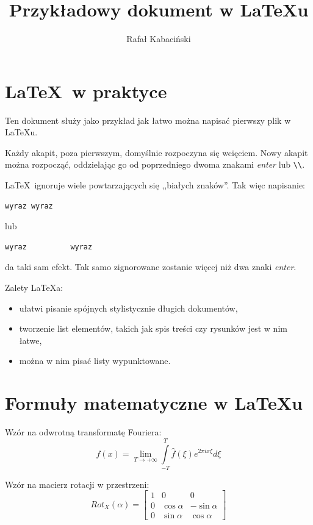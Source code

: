 \documentclass[10pt,a4paper]{article}
\title{Przykładowy dokument w \LaTeX u}
\author{Rafał Kabaciński}
\begin{document}
	
	\maketitle
	
	\tableofcontents
	
	\section{\LaTeX\ w praktyce}
	Ten dokument służy jako przykład jak łatwo można napisać pierwszy plik w \LaTeX u. 
	
	Każdy akapit, poza pierwszym, domyślnie rozpoczyna się wcięciem.
	Nowy akapit można rozpocząć, oddzielając go od poprzedniego dwoma znakami \emph{enter} lub \verb|\\|.
	
	
	
	\LaTeX\ ignoruje        wiele powtarzających się ,,białych znaków''. Tak więc napisanie: 
		\begin{lstlisting}[language=TeX]
			wyraz wyraz
		\end{lstlisting}
	
	lub
	
		\begin{lstlisting}[language=TeX]
			wyraz          wyraz
		\end{lstlisting}
	da taki sam efekt. Tak samo zignorowane zostanie więcej niż dwa znaki \emph{enter}.
	
	Zalety \LaTeX a:
	\begin{itemize}
		\item ułatwi pisanie spójnych stylistycznie długich dokumentów,
		\item tworzenie list elementów, takich jak spis treści czy rysunków jest w nim łatwe,
		\item można w nim pisać listy wypunktowane.
	\end{itemize}
	
	\section{Formuły matematyczne w \LaTeX u}
	
	Wzór na odwrotną transformatę Fouriera:
	\begin{equation}
		f(x) = \lim \limits_{T\rightarrow + \infty} \int \limits_{-T}^{T} \hat f (\xi) e^{2\pi i x \xi} d\xi
	\end{equation}
	
	Wzór na macierz rotacji w przestrzeni:
	$$
	Rot_X(\alpha) = \left[
	\begin{array}{ccc}
	1 & 0 & 0 \\
	0 & \cos \alpha & -\sin \alpha \\
	0 & \sin \alpha & \cos \alpha 
	\end{array}\right]
	$$
	
\end{document}
